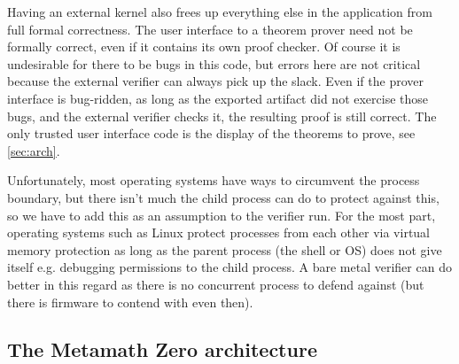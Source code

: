 \documentclass[runningheads]{llncs}
\begin{document}
Having an external kernel also frees up everything else in the application from full formal correctness. The user interface to a theorem prover need not be formally correct, even if it contains its own proof checker. Of course it is undesirable for there to be bugs in this code, but errors here are not critical because the external verifier can always pick up the slack. Even if the prover interface is bug-ridden, as long as the exported artifact did not exercise those bugs, and the external verifier checks it, the resulting proof is still correct. The only trusted user interface code is the display of the theorems to prove, see \autoref{sec:arch}.

Unfortunately, most operating systems have ways to circumvent the process boundary, but there isn't much the child process can do to protect against this, so we have to add this as an assumption to the verifier run. For the most part, operating systems such as Linux protect processes from each other via virtual memory protection as long as the parent process (the shell or OS) does not give itself e.g. debugging permissions to the child process. A bare metal verifier can do better in this regard as there is no concurrent process to defend against (but there is firmware to contend with even then).

\subsection{The Metamath Zero architecture}\label{sec:arch}
\end{document}
